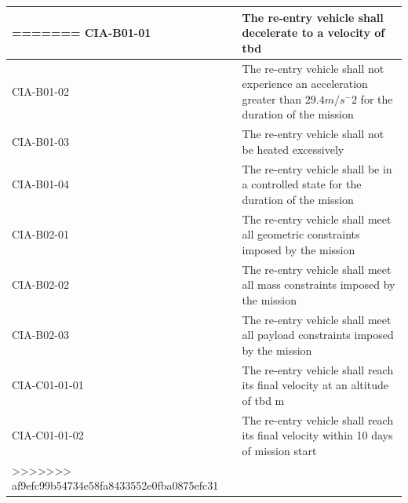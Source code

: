 \begin{table}[H]
\begin{tabular}{|p{}|p{}|}
=======
    CIA-B01-01 & The re-entry vehicle shall decelerate to a velocity of \gls{tbd}     
\\ \hline
    CIA-B01-02 & The re-entry vehicle shall not experience an acceleration greater than $29.4 m/s^-2	$ for the duration of the mission			\\ \hline
    CIA-B01-03 & The re-entry vehicle shall not be heated excessively  \\ \hline
    CIA-B01-04 & The re-entry vehicle shall be in a controlled state for the duration of the mission                            \\ \hline
    CIA-B02-01 & The re-entry vehicle shall meet all geometric constraints imposed by the mission                           \\ \hline
    CIA-B02-02 & The re-entry vehicle shall meet all mass constraints imposed by the mission                                      \\ \hline
	CIA-B02-03 & The re-entry vehicle shall meet all payload constraints imposed by the mission 
\\ \hline
		CIA-C01-01-01 & The re-entry vehicle shall reach its final velocity at an altitude of \gls{tbd} m 
\\ \hline
		CIA-C01-01-02 & The re-entry vehicle shall reach its final velocity within 10 days of mission start 
\\ \hline
>>>>>>> af9efc99b54734e58fa8433552e0fba0875efc31
    \end{tabular}
    \label{tab:toplevelreq}
\end{table}












